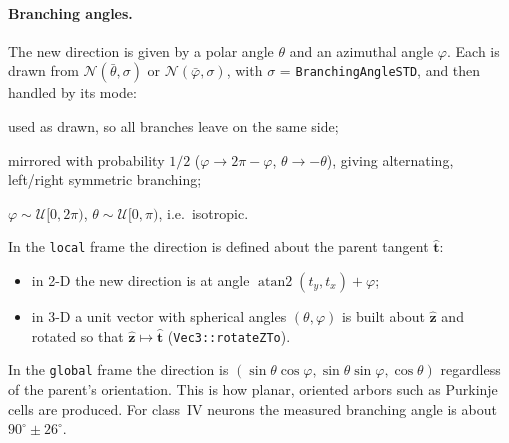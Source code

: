 \documentclass[11pt,a4paper]{article}
\newcommand{\code}[1]{\texttt{#1}}
\newcommand{\vect}[1]{\bm{#1}}
\begin{document}
\paragraph{Branching angles.}
The new direction is given by a polar angle $\theta$ and an azimuthal angle $\varphi$. Each is drawn from $\mathcal N(\bar\theta,\sigma)$ or $\mathcal N(\bar\varphi,\sigma)$, with $\sigma$ = \code{BranchingAngleSTD}, and then handled by its mode:
\begin{description}[leftmargin=2.2cm,style=nextline]
  \item[\code{fixed}] used as drawn, so all branches leave on the same side;
  \item[\code{reflective}] mirrored with probability $1/2$ ($\varphi\to2\pi-\varphi$, $\theta\to-\theta$), giving alternating, left/right symmetric branching;
  \item[\code{uniform}] $\varphi\sim\mathcal U[0,2\pi)$, $\theta\sim\mathcal U[0,\pi)$, i.e.\ isotropic.
\end{description}
In the \code{local} frame the direction is defined about the parent tangent $\hat{\vect t}$:
\begin{itemize}
  \item in 2-D the new direction is at angle $\operatorname{atan2}(t_y,t_x)+\varphi$;
  \item in 3-D a unit vector with spherical angles $(\theta,\varphi)$ is built about $\hat{\vect z}$ and rotated so that $\hat{\vect z}\mapsto\hat{\vect t}$ (\code{Vec3::rotateZTo}).
\end{itemize}
In the \code{global} frame the direction is $(\sin\theta\cos\varphi,\sin\theta\sin\varphi,\cos\theta)$ regardless of the parent's orientation. This is how planar, oriented arbors such as Purkinje cells are produced. For class~IV neurons the measured branching angle is about $90^\circ\pm26^\circ$.
\end{document}
